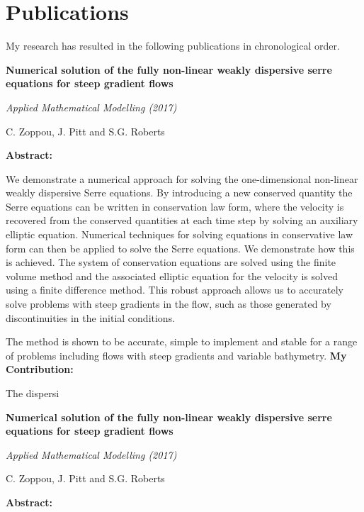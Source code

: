 \chapter{Publications}
\label{app:Pub}
My research has resulted in the following publications in chronological order.

\begin{center}
	\textbf{
		\Large Numerical solution of the fully non-linear weakly dispersive
		serre equations for steep gradient flows}
	
	\vspace*{\baselineskip}
	
	\textit{Applied Mathematical Modelling (2017)}
	
	{C. Zoppou, J. Pitt and S.G. Roberts}
	\vspace*{0.5\baselineskip}
\end{center}
\textbf{Abstract:}

We demonstrate a numerical approach for solving the one-dimensional non-linear weakly dispersive Serre equations. By introducing a new conserved quantity the Serre equations can be written in conservation law form, where the velocity is recovered from the conserved quantities at each time step by solving an auxiliary elliptic equation. Numerical techniques for solving equations in conservative law form can then be applied to solve the	Serre equations. We demonstrate how this is achieved. The system of conservation equations are solved using the finite volume method and the associated elliptic equation for the velocity is solved using a finite difference method. This robust approach allows us to accurately solve problems with steep gradients in the flow, such as those generated by discontinuities in the initial conditions.

The method is shown to be accurate, simple to implement and stable for a range of problems including flows with steep gradients and variable bathymetry.
\newline
\textbf{My Contribution:}

The dispersi

\newpage

\begin{center}
\textbf{
	 \Large Numerical solution of the fully non-linear weakly dispersive
serre equations for steep gradient flows}

\vspace*{\baselineskip}

\textit{Applied Mathematical Modelling (2017)}

{C. Zoppou, J. Pitt and S.G. Roberts}
\vspace*{0.5\baselineskip}
\end{center}
\textbf{Abstract:}

